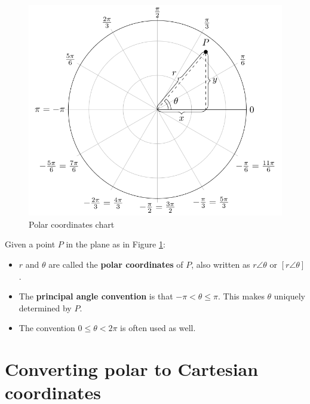 \documentclass[
  12pt,
  oneside]{book}
\providecommand{\tightlist}{%
  \setlength{\itemsep}{0pt}\setlength{\parskip}{0pt}}
\theoremstyle{definition}
\theoremstyle{definition}
\theoremstyle{definition}
\theoremstyle{definition}
\theoremstyle{remark}
\begin{document}
\begin{figure}

{\centering \includegraphics{t18-polar-pics-1} 

}

\caption{Polar coordinates chart}\label{fig:t18-polar-chart}
\end{figure}

Given a point \(P\) in the plane as in Figure \ref{fig:t18-polar-chart}:

\begin{itemize}
\tightlist
\item
  \(r\) and \(\theta\) are called the \textbf{polar coordinates} of \(P\), also written as \(r\angle\theta\) or \([r\angle\theta]\).
\item
  The \textbf{principal angle convention} is that \(-\pi<\theta\leq\pi\). This makes \(\theta\) uniquely determined by \(P\).
\item
  The convention \(0\leq\theta<2\pi\) is often used as well.
\end{itemize}

\hypertarget{converting-polar-to-cartesian-coordinates}{%
\section{Converting polar to Cartesian coordinates}\label{converting-polar-to-cartesian-coordinates}}
\end{document}
